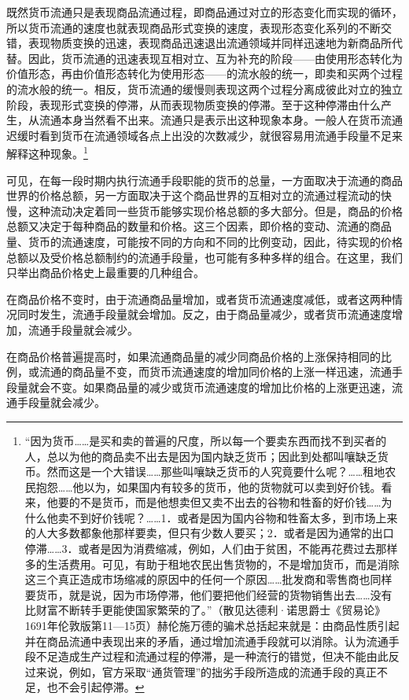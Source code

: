 \documentclass{ctexbook}
\begin{document}
        既然货币流通只是表现商品流通过程，即商品通过对立的形态变化而实现的循环，所以货币流通的速度也就表现商品形式变换的速度，表现形态变化系列的不断交错，表现物质变换的迅速，表现商品迅速退出流通领域并同样迅速地为新商品所代替。因此，货币流通的迅速表现互相对立、互为补充的阶段——由使用形态转化为价值形态，再由价值形态转化为使用形态——的流水般的统一，即卖和买两个过程的流水般的统一。相反，货币流通的缓慢则表现这两个过程分离成彼此对立的独立阶段，表现形式变换的停滞，从而表现物质变换的停滞。至于这种停滞由什么产生，从流通本身当然看不出来。流通只是表示出这种现象本身。一般人在货币流通迟缓时看到货币在流通领域各点上出没的次数减少，就很容易用流通手段量不足来解释这种现象。\footnote{“因为货币……是买和卖的普遍的尺度，所以每一个要卖东西而找不到买者的人，总以为他的商品卖不出去是因为国内缺乏货币；因此到处都叫嚷缺乏货币。然而这是一个大错误……那些叫嚷缺乏货币的人究竟要什么呢？……租地农民抱怨……他以为，如果国内有较多的货币，他的货物就可以卖到好价钱。看来，他要的不是货币，而是他想卖但又卖不出去的谷物和牲畜的好价钱……为什么他卖不到好价钱呢？……1．或者是因为国内谷物和牲畜太多，到市场上来的人大多数都象他那样要卖，但只有少数人要买；2．或者是因为通常的出口停滞……3．或者是因为消费缩减，例如，人们由于贫困，不能再花费过去那样多的生活费用。可见，有助于租地农民出售货物的，不是增加货币，而是消除这三个真正造成市场缩减的原因中的任何一个原因……批发商和零售商也同样要货币，就是说，因为市场停滞，他们要把他们经营的货物销售出去……没有比财富不断转手更能使国家繁荣的了。”（散见达德利·诺思爵士《贸易论》1691年伦敦版第11—15页）赫伦施万德的骗术总括起来就是：由商品性质引起并在商品流通中表现出来的矛盾，通过增加流通手段就可以消除。认为流通手段不足造成生产过程和流通过程的停滞，是一种流行的错觉，但决不能由此反过来说，例如，官方采取“通货管理”的拙劣手段所造成的流通手段的真正不足，也不会引起停滞。}
        
        可见，在每一段时期内执行流通手段职能的货币的总量，一方面取决于流通的商品世界的价格总额，另一方面取决于这个商品世界的互相对立的流通过程流动的快慢，这种流动决定着同一些货币能够实现价格总额的多大部分。但是，商品的价格总额又决定于每种商品的数量和价格。这三个因素，即价格的变动、流通的商品量、货币的流通速度，可能按不同的方向和不同的比例变动，因此，待实现的价格总额以及受价格总额制约的流通手段量，也可能有多种多样的组合。在这里，我们只举出商品价格史上最重要的几种组合。
        
        在商品价格不变时，由于流通商品量增加，或者货币流通速度减低，或者这两种情况同时发生，流通手段量就会增加。反之，由于商品量减少，或者货币流通速度增加，流通手段量就会减少。
        
        在商品价格普遍提高时，如果流通商品量的减少同商品价格的上涨保持相同的比例，或流通的商品量不变，而货币流通速度的增加同价格的上涨一样迅速，流通手段量就会不变。如果商品量的减少或货币流通速度的增加比价格的上涨更迅速，流通手段量就会减少。
        
\end{document}

